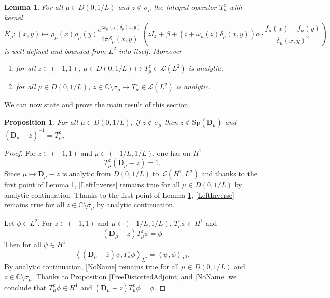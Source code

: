 \documentclass[a4paper, 12pt]{amsart}
\numberwithin{equation}{section}
\newtheorem{proposition}{Proposition}[section]
\newtheorem{lemma}{Lemma}[section]
\newcommand{\C}{\mathbb{C}} %
\newcommand{\Sp}{\mathrm{Sp}} %
\newcommand{\lp}{\left(} %
\newcommand{\rp}{\right)} %
\newcommand{\la}{\left\langle} %
\newcommand{\ra}{\right\rangle} %
\newcommand{\Dvec}{\mathbf{D}}
\newcommand{\Lcal}{\mathcal{L}}
\begin{document}
\begin{lemma}\label{TAnalyticity}
    For all $\mu\in D(0,1/L)$ and $z\not\in\sigma_\mu$ the integral operator $T_\mu^z$ with kernel 
    \[K_\mu^z:(x,y)\mapsto \rho_\mu(x)\rho_\mu(y)\frac{e^{ i\omega_\mu(z) \delta_\mu(x,y)}}{4\pi\delta_\mu(x,y)}\lp zI_4+\beta+\lp i+\omega_\mu(z) \delta_\mu(x,y)\rp\alpha\cdot\frac{ f_\mu(x)- f_\mu(y)}{\delta_\mu(x,y)^2}\rp\] 
    is well defined and bounded from $ L^2$ into itself. Moreover
    \begin{enumerate}
        \item for all $z\in(-1,1)$, $\mu\in D(0,1/L)\mapsto T_\mu^z\in\Lcal(L^2)$ is analytic,
        \item for all $\mu\in D(0,1/L)$, $z\in\C\setminus\sigma_\mu\mapsto T_\mu^z\in\Lcal(L^2)$ is analytic.
    \end{enumerate}
\end{lemma} 

We can now state and prove the main result of this section.

\begin{proposition}\label{DistortedResolvent}
    For all $\mu\in D(0,1/L)$, if $z\not\in\sigma_\mu$ then $z\not\in\Sp(\Dvec_\mu)$ and $(\Dvec_\mu-z)^{-1}=T_\mu^z$.
\end{proposition}

\begin{proof}
    For $z\in(-1,1)$ and $\mu\in(-1/L,1/L)$, one has on $H^1$ 
    \begin{equation}\label{LeftInverse}
        T_\mu^z(\Dvec_\mu-z)=1.
    \end{equation}
    Since $\mu\mapsto \Dvec_\mu-z$ is analytic from $D(0,1/L)$ to $\Lcal(H^1,L^2)$ and thanks to the first point of Lemma \ref{TAnalyticity}, \eqref{LeftInverse} remains true for all $\mu\in D(0,1/L)$ by analytic continuation. Thanks to the first point of Lemma \ref{TAnalyticity}, \eqref{LeftInverse} remains true for all $z\in\C\setminus\sigma_\mu$ by analytic continuation. 
    
    Let $\phi\in L^2$. For $z\in(-1,1)$ and $\mu\in(-1/L,1/L)$, $T_\mu^z\phi\in H^1$ and
    \begin{equation*}\label{RightInverse}
        (\Dvec_\mu-z)T_\mu^z\phi=\phi
    \end{equation*}
    Then for all $\psi\in H^1$ 
    \begin{equation}\label{NoName}
        \la(\Dvec_{\overline{\mu}}-\overline{z})\psi,T_\mu^z\phi\ra_{L^2}=\la\psi,\phi\ra_{L^2}.
    \end{equation}
    By analytic continuation, \eqref{NoName} remains true for all $\mu\in D(0,1/L)$ and $z\in\C\setminus\sigma_\mu$. Thanks to Proposition \ref{FreeDistortedAdjoint} and \eqref{NoName} we conclude that $T_\mu^z\phi\in H^1$ and $(\Dvec_\mu-z)T_\mu^z\phi=\phi$. 
\end{proof}
\end{document}
